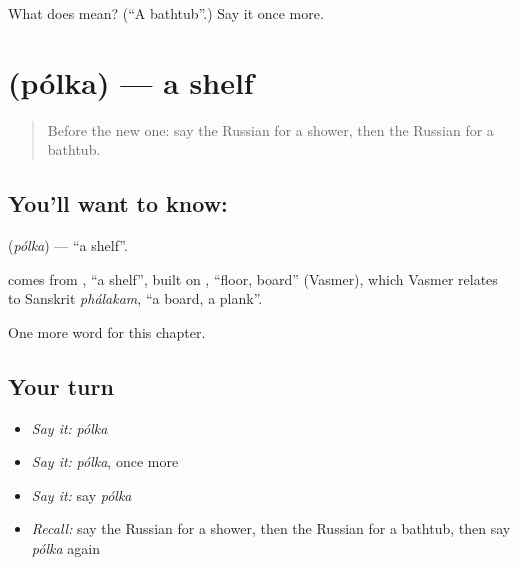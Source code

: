 \begin{tcolorbox}[breakable,colback=teal!4,colframe=teal!35!black,title={Before you move on}]
What does  mean? (\textquotedblleft{}A bathtub\textquotedblright{}.) Say it once more.
\end{tcolorbox}
\section[\texorpdfstring{\ru{полка} (pólka)}{полка (pólka)}]{ (pólka) — a shelf}

\label{lesson:RU-C95-shelf}



\begin{quote}
Before the new one: say the Russian for a shower, then the Russian for a bathtub.
\end{quote}

\subsection*{You'll want to know: }
\textbf{} (\emph{pólka}) — \textquotedblleft{}a shelf\textquotedblright{}.

\begin{cousinweb}
\textbf{} comes from \emph{}, \textquotedblleft{}a shelf\textquotedblright{}, built on \emph{}, \textquotedblleft{}floor, board\textquotedblright{} (Vasmer), which Vasmer relates to Sanskrit \emph{phálakam}, \textquotedblleft{}a board, a plank\textquotedblright{}.
\end{cousinweb}

\begin{grammarlens}[title={What you've built}]
One more word for this chapter.
\end{grammarlens}

\subsection*{Your turn}
\begin{itemize}
\raggedright
  \item \emph{Say it:} \emph{pólka}
  \item \emph{Say it:} \emph{pólka}, once more
  \item \emph{Say it:} say \emph{pólka}
  \item \emph{Recall:} say the Russian for a shower, then the Russian for a bathtub, then say \emph{pólka} again
\end{itemize}

